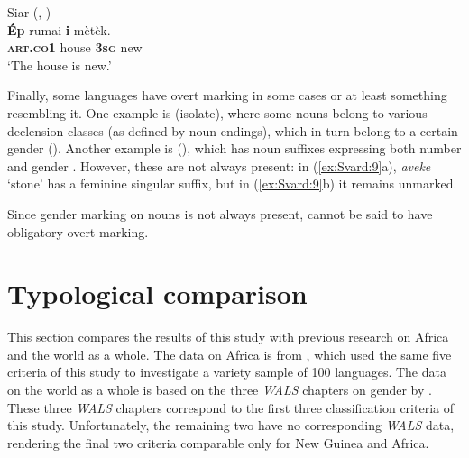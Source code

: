 \documentclass[output=collectionpaper]{langsci/langscibook}
\begin{document}
\ea
\label{ex:Svard:8}
Siar (, ) \citep[206]{Frowein2011}\\
\gll \textbf{Ép} rumai \textbf{i} mètèk.\\
     \textsc{\textbf{art.co1}} house \textsc{\textbf{3sg}} new\\
\glt `The house is new.'
\z


Finally, some languages have overt marking in some cases or at least something resembling it. One example is  (isolate), where some nouns belong to various declension classes (as defined by noun endings), which in turn belong to a certain gender (\citealt[176]{Lindstroem2002}). Another example is  (), which has noun suffixes expressing both number and gender \citep[41]{Robinson2011}. However, these are not always present: in (\ref{ex:Svard:9}a), \textit{aveke} `stone' has a feminine singular suffix, but in (\ref{ex:Svard:9}b) it remains unmarked.

%

Since gender marking on nouns is not always present,  cannot be said to have obligatory overt marking.

\section{ Typological comparison}
\label{sec:Svard:4}

This section compares the results of this study with previous research on Africa and the world as a whole. The data on Africa is from \citet{DiGarbo2014}, which used the same five criteria of this study to investigate a variety sample of 100 languages. The data on the world as a whole is based on the three \textit{WALS} chapters on gender by  \citet{Corbett2013,Corbett2013a,Corbett2013b}. These three \textit{WALS} chapters correspond to the first three classification criteria of this study. Unfortunately, the remaining two have no corresponding \textit{WALS} data, rendering the final two criteria comparable only for New Guinea and Africa.
\end{document}
